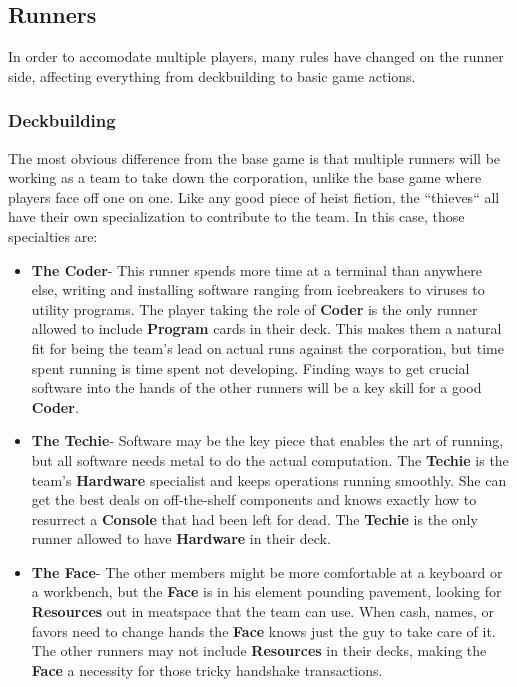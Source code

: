 \documentclass[titlepage]{article}
\begin{document}
\subsection{Runners}

In order to accomodate multiple players, many rules have changed on the runner side, affecting everything from deckbuilding to basic game actions.

\subsubsection{Deckbuilding}

The most obvious difference from the base game is that multiple runners will be working as a team to take down the corporation, unlike the base game where players face off one on one. Like any good piece of heist fiction, the ``thieves`` all have their own specialization to contribute to the team. In this case, those specialties are:
\begin{itemize}
	\item \textbf{The Coder}-
		This runner spends more time at a terminal than anywhere else, writing and installing software ranging from icebreakers to viruses to utility programs. The player taking the role of \textbf{Coder} is the only runner allowed to include \textbf{Program} cards in their deck. This makes them a natural fit for being the team's lead on actual runs against the corporation, but time spent running is time spent not developing. Finding ways to get crucial software into the hands of the other runners will be a key skill for a good \textbf{Coder}.
	\item \textbf{The Techie}-
		Software may be the key piece that enables the art of running, but all software needs metal to do the actual computation. The \textbf{Techie} is the team's \textbf{Hardware} specialist and keeps operations running smoothly. She can get the best deals on off-the-shelf components and knows exactly how to resurrect a \textbf{Console} that had been left for dead. The \textbf{Techie} is the only runner allowed to have \textbf{Hardware} in their deck.
	\item \textbf{The Face}-
		The other members might be more comfortable at a keyboard or a workbench, but the \textbf{Face} is in his element pounding pavement, looking for \textbf{Resources} out in meatspace that the team can use. When cash, names, or favors need to change hands the \textbf{Face} knows just the guy to take care of it. The other runners may not include \textbf{Resources} in their decks, making the \textbf{Face} a necessity for those tricky handshake transactions.

\end{itemize}
\end{document}
